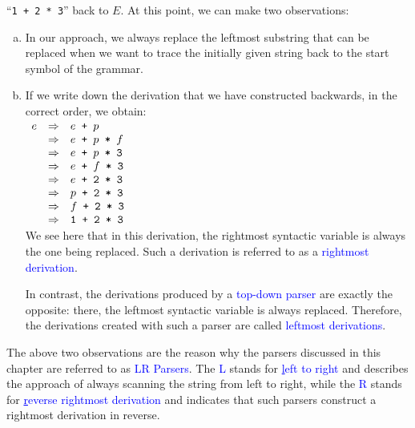 ``\texttt{1 + 2 * 3}'' back to \(E\). At this point, we can make two observations: 
\begin{enumerate}[(a)]
\item In our approach, we always replace the leftmost substring that can be replaced when we want to trace the
  initially given string back to the start symbol of the grammar. 
\item If we write down the derivation that we have constructed backwards, in the correct order, we obtain:
\\[0.2cm]
\hspace*{1.3cm}
$
\begin{array}[t]{lcl}
e  & \Rightarrow & e \texttt{ + } p \\
   & \Rightarrow & e \texttt{ + } p \texttt{ * } f \\
   & \Rightarrow & e \texttt{ + } p \texttt{ * 3} \\
   & \Rightarrow & e \texttt{ + } f \texttt{ * 3} \\
   & \Rightarrow & e \texttt{ + 2 * 3} \\
   & \Rightarrow & p \texttt{ + 2 * 3} \\
   & \Rightarrow & f \texttt{ + 2 * 3} \\
   & \Rightarrow & \texttt{1 + 2 * 3}
\end{array}
$
   \\[0.2cm]
   We see here that in this derivation, the rightmost syntactic variable is always the one being replaced. Such
   a derivation is referred to as a \textcolor{blue}{rightmost derivation}. 

   In contrast, the derivations produced by a \textcolor{blue}{top-down parser} are exactly the opposite:
   there, the leftmost syntactic variable is always replaced. Therefore, the derivations created with such a
   parser are called \textcolor{blue}{leftmost derivations}. 
\end{enumerate}
The above two observations are the reason why the parsers discussed in this chapter are referred to as
\textcolor{blue}{LR Parsers}. The \textcolor{blue}{L} stands for \textcolor{blue}{\underline{l}eft to right}
and describes the approach of always scanning the string from left to right, while the \textcolor{blue}{R}
stands for \textcolor{blue}{\underline{r}everse rightmost derivation} and indicates that such parsers construct
a rightmost derivation in reverse. 
\vspace*{0.2cm}

